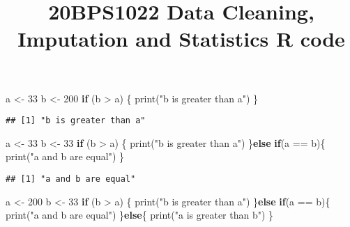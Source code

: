 \documentclass[
]{article}
\title{20BPS1022 Data Cleaning, Imputation and Statistics R code}
\author{}
\date{\vspace{-2.5em}}
\newenvironment{Shaded}{\begin{snugshade}}{\end{snugshade}}
\newcommand{\ControlFlowTok}[1]{\textcolor[rgb]{0.13,0.29,0.53}{\textbf{#1}}}
\newcommand{\DecValTok}[1]{\textcolor[rgb]{0.00,0.00,0.81}{#1}}
\newcommand{\FunctionTok}[1]{\textcolor[rgb]{0.00,0.00,0.00}{#1}}
\newcommand{\NormalTok}[1]{#1}
\newcommand{\OtherTok}[1]{\textcolor[rgb]{0.56,0.35,0.01}{#1}}
\newcommand{\SpecialCharTok}[1]{\textcolor[rgb]{0.00,0.00,0.00}{#1}}
\newcommand{\StringTok}[1]{\textcolor[rgb]{0.31,0.60,0.02}{#1}}
\begin{document}
\maketitle

\begin{Shaded}
\begin{Highlighting}[]
\NormalTok{a }\OtherTok{\textless{}{-}} \DecValTok{33} 
\NormalTok{b }\OtherTok{\textless{}{-}} \DecValTok{200}
\ControlFlowTok{if}\NormalTok{ (b }\SpecialCharTok{\textgreater{}}\NormalTok{ a) \{}
  \FunctionTok{print}\NormalTok{(}\StringTok{"b is greater than a"}\NormalTok{)}
\NormalTok{\}}
\end{Highlighting}
\end{Shaded}

\begin{verbatim}
## [1] "b is greater than a"
\end{verbatim}

\begin{Shaded}
\begin{Highlighting}[]
\NormalTok{a }\OtherTok{\textless{}{-}} \DecValTok{33} 
\NormalTok{b }\OtherTok{\textless{}{-}} \DecValTok{33}
\ControlFlowTok{if}\NormalTok{ (b }\SpecialCharTok{\textgreater{}}\NormalTok{ a) \{}
  \FunctionTok{print}\NormalTok{(}\StringTok{"b is greater than a"}\NormalTok{)}
\NormalTok{\}}\ControlFlowTok{else} \ControlFlowTok{if}\NormalTok{(a }\SpecialCharTok{==}\NormalTok{ b)\{}
  \FunctionTok{print}\NormalTok{(}\StringTok{"a and b are equal"}\NormalTok{)}
\NormalTok{\}}
\end{Highlighting}
\end{Shaded}

\begin{verbatim}
## [1] "a and b are equal"
\end{verbatim}

\begin{Shaded}
\begin{Highlighting}[]
\NormalTok{a }\OtherTok{\textless{}{-}} \DecValTok{200}
\NormalTok{b }\OtherTok{\textless{}{-}} \DecValTok{33}
\ControlFlowTok{if}\NormalTok{ (b }\SpecialCharTok{\textgreater{}}\NormalTok{ a) \{}
  \FunctionTok{print}\NormalTok{(}\StringTok{"b is greater than a"}\NormalTok{)}
\NormalTok{\}}\ControlFlowTok{else} \ControlFlowTok{if}\NormalTok{(a }\SpecialCharTok{==}\NormalTok{ b)\{}
  \FunctionTok{print}\NormalTok{(}\StringTok{"a and b are equal"}\NormalTok{)}
\NormalTok{\}}\ControlFlowTok{else}\NormalTok{\{}
  \FunctionTok{print}\NormalTok{(}\StringTok{"a is greater than b"}\NormalTok{)}
\NormalTok{\}}
\end{Highlighting}
\end{Shaded}
\end{document}

